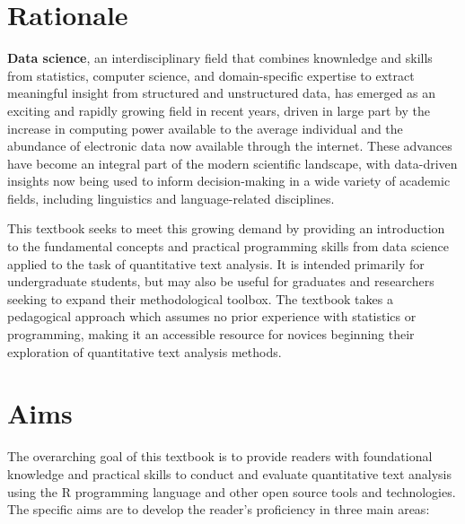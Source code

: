 \documentclass[
  letterpaper,
  krantz1]{latex/krantz-mod}
\theoremstyle{definition}
\theoremstyle{definition}
\theoremstyle{remark}
\begin{document}
\section*{Rationale}\label{sec-preface-rationale}


\textbf{Data science}, an interdisciplinary field
that combines knownledge and skills from statistics, computer science,
and domain-specific expertise to extract meaningful insight from
structured and unstructured data, has emerged as an exciting and rapidly
growing field in recent years, driven in large part by the increase in
computing power available to the average individual and the abundance of
electronic data now available through the internet. These advances have
become an integral part of the modern scientific landscape, with
data-driven insights now being used to inform decision-making in a wide
variety of academic fields, including linguistics and language-related
disciplines.

This textbook seeks to meet this growing demand by providing an
introduction to the fundamental concepts and practical programming
skills from data science applied to the task of quantitative text
analysis. It is intended primarily for undergraduate students, but may
also be useful for graduates and researchers seeking to expand their
methodological toolbox. The textbook takes a pedagogical approach which
assumes no prior experience with statistics or programming, making it an
accessible resource for novices beginning their exploration of
quantitative text analysis methods.

\section*{Aims}\label{sec-preface-aims}


The overarching goal of this textbook is to provide readers with
foundational knowledge and practical skills to conduct and evaluate
quantitative text analysis using the R programming language and other
open source tools and technologies. The specific aims are to develop the
reader's proficiency in three main areas:
\end{document}

